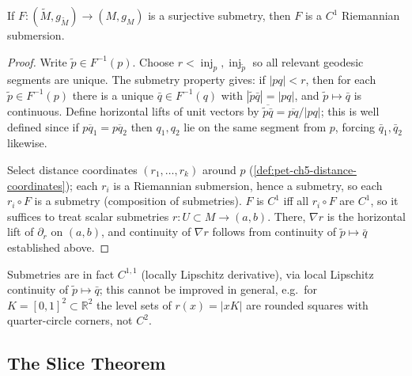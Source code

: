 \begin{theorem}
  \label{thm:pet-ch5-berestovskii-submetry}
  If $F:(\tilde M,g_{\tilde M})\to(M,g_M)$ is a surjective submetry, then $F$ is a
  $C^1$ Riemannian submersion.
\end{theorem}
\begin{proof}
  Write $\tilde p\in F^{-1}(p)$. Choose $r<\operatorname{inj}_p,\operatorname{inj}_{\tilde p}$
  so all relevant geodesic segments are unique. The submetry property gives: if
  $|pq|<r$, then for each $\tilde p\in F^{-1}(p)$ there is a unique
  $\bar q\in F^{-1}(q)$ with $|\tilde p\bar q|=|pq|$, and $\tilde p\mapsto\bar q$ is
  continuous. Define horizontal lifts of unit vectors by
  $\overline{\tilde p\bar q}=\overline{pq}/|pq|$; this is well defined since if
  $\overline{p q_1}=\overline{pq_2}$ then $q_1,q_2$ lie on the same segment from $p$,
  forcing $\bar q_1,\bar q_2$ likewise.

  Select distance coordinates $(r_1,\dots,r_k)$ around $p$
  (\cref{def:pet-ch5-distance-coordinates}); each $r_i$ is a Riemannian submersion,
  hence a submetry, so each $r_i\circ F$ is a submetry (composition of submetries).
  $F$ is $C^1$ iff all $r_i\circ F$ are $C^1$, so it suffices to treat scalar
  submetries $r:U\subset M\to(a,b)$. There, $\nabla r$ is the horizontal lift of
  $\partial_r$ on $(a,b)$, and continuity of $\nabla r$ follows from continuity of
  $\tilde p\mapsto\bar q$ established above.
\end{proof}

\begin{remark}
  \label{rem:pet-ch5-submetry-c11}
  Submetries are in fact $C^{1,1}$ (locally Lipschitz derivative), via local
  Lipschitz continuity of $\tilde p\mapsto\bar q$; this cannot be improved in
  general, e.g.\ for $K=[0,1]^2\subset\mathbb R^2$ the level sets of $r(x)=|xK|$ are
  rounded squares with quarter-circle corners, not $C^2$.
\end{remark}

\subsection{The Slice Theorem}

